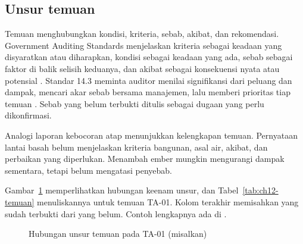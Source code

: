 \subsection*{Unsur temuan}

Temuan menghubungkan kondisi, kriteria, sebab, akibat, dan rekomendasi. Government Auditing
Standards menjelaskan kriteria sebagai keadaan yang disyaratkan atau diharapkan, kondisi sebagai
keadaan yang ada, sebab sebagai faktor di balik selisih keduanya, dan akibat sebagai konsekuensi
nyata atau potensial \cite{c12-gagas2024}. Standar 14.3 meminta auditor menilai signifikansi dari
peluang dan dampak, mencari akar sebab bersama manajemen, lalu memberi prioritas tiap temuan
\cite{iia-gias2024}. Sebab yang belum terbukti ditulis sebagai dugaan yang perlu dikonfirmasi.

Analogi laporan kebocoran atap menunjukkan kelengkapan temuan. Pernyataan lantai basah belum
menjelaskan kriteria bangunan, asal air, akibat, dan perbaikan yang diperlukan. Menambah ember
mungkin mengurangi dampak sementara, tetapi belum mengatasi penyebab.

Gambar~\ref{fig:ch12-unsur-temuan} memperlihatkan hubungan keenam unsur, dan
Tabel~\ref{tab:ch12-temuan} menuliskannya untuk temuan TA-01. Kolom terakhir memisahkan yang sudah
terbukti dari yang belum. Contoh lengkapnya ada di .

\begin{figure}[!htb]
  \centering
  
  \caption{Hubungan unsur temuan pada TA-01 (misalkan)}
  \label{fig:ch12-unsur-temuan}
\end{figure}

